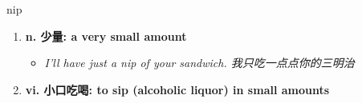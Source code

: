 
\begin{frame}
{\huge nip}
\begin{center}
\begin{enumerate}\Large
  \item \textbf{n. 少量: a very small amount}
  \begin{itemize}
    \item \em{\Large{I'll have just a nip of your sandwich. 我只吃一点点你的三明治}}
  \end{itemize}
  \item \textbf{vi. 小口吃喝: to sip (alcoholic liquor) in small amounts}
\end{enumerate}
\end{center}
\end{frame}
